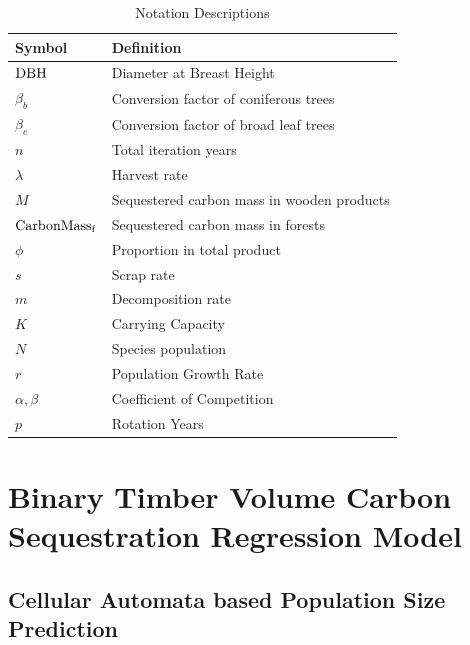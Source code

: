 \documentclass{mcmthesis}
\numberwithin{figure}{section}
\numberwithin{table}{section}
\numberwithin{equation}{section}
\begin{document}
\begin{table}[htpb!]
  \centering
  \caption{Notation Descriptions}
  \begin{tabular}{m{2.5cm}<{\centering}|m{12.5cm}<{\centering}}
  \toprule[1.5pt]
  \textbf{Symbol} & \textbf{Definition} \\ \hline
  $ \rm{DBH} $ & Diameter at Breast Height \\
  $ \beta_b $ & Conversion factor of coniferous trees\\
  $\beta_c$ & Conversion factor of broad leaf trees\\
  $ n $ & Total iteration years\\
  $ \lambda $ & Harvest rate\\
  $ M $ & Sequestered carbon mass in wooden products \\
  $ \rm{CarbonMass_f} $ & Sequestered carbon mass in forests \\
  $ \phi $ & Proportion in total product\\
  $ s $ & Scrap rate\\
  $ m $ & Decomposition rate \\
  $ K $ & Carrying Capacity \\
  $ N $ & Species population \\
  $ r $ & Population Growth Rate\\
  $ \alpha,\beta $ & Coefficient of Competition\\
  $ p $ & Rotation Years \\
  

  \bottomrule[1.5pt]
  \end{tabular}
\end{table}

\newpage

\section{Binary Timber Volume Carbon Sequestration Regression Model}
\subsection{Cellular Automata based Population Size Prediction}
\end{document}
